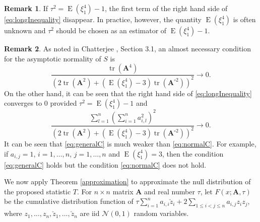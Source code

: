 \documentclass[bj]{imsart}
\DeclareMathOperator{\mytr}{tr}
\DeclareMathOperator{\myE}{E}
\newcommand{\BA}{\mathbf{A}}    \newcommand{\BB}{\mathbf{B}}    \newcommand{\BC}{\mathbf{C}}    \newcommand{\BD}{\mathbf{D}}    \newcommand{\BE}{\mathbf{E}}    \newcommand{\BF}{\mathbf{F}}    \newcommand{\BG}{\mathbf{G}}    \newcommand{\BH}{\mathbf{H}}    \newcommand{\BI}{\mathbf{I}}    \newcommand{\BJ}{\mathbf{J}}    \newcommand{\BK}{\mathbf{K}}    \newcommand{\BL}{\mathbf{L}}
\theoremstyle{plain}
\theoremstyle{definition}
\newtheorem{remark}{\quad\quad Remark}
\theoremstyle{remark}
\begin{document}
\begin{remark}\label{remark1}
    If $\tau^2=\myE (\xi_1^4) -1$, the first term of the right hand side of \eqref{eq:longInequality} disappear.
    In practice, however, the quantity $\myE (\xi_1^4)$ is often unknown and
    $\tau^2$ should be chosen as an estimator of $\myE (\xi_1^4)-1$.
\end{remark}

\begin{remark}
    As noted in Chatterjee \cite{Chatterjee2008}, Section 3.1, an almost necessary condition for the asymptotic normality of $S$ is
    \begin{equation}\label{eq:normalC}
        \frac{\mytr (\BA^4)}{
            \left( 
        2 \mytr(\BA^2)
    +
    (\myE (\xi_1^4)-3)\mytr(\BA^{\circ 2})
            \right)^2
        }\to 0. 
    \end{equation}
    On the other hand, it can be seen that the right hand side of \eqref{eq:longInequality} converges to $0$ provided $\tau^2=\myE (\xi_1^4)-1$ and
    \begin{equation}\label{eq:generalC}
            \frac{
                \sum_{l=1}^n \left( \sum_{i=1}^n a_{i,l}^2 \right)^2
            }{
            \left(
        2 \mytr(\BA^2)
    +
    (\myE (\xi_1^4)-3)\mytr(\BA^{\circ 2})
\right)^{2}
            }
            \to 0.
    \end{equation}
    It can be seen that \eqref{eq:generalC} is much weaker than \eqref{eq:normalC}.
    For example, if $a_{i,j}=1$, $i=1,\ldots, n$, $j=1,\ldots, n$ and $\myE (\xi_1^4)=3$, then the condition \eqref{eq:generalC} holds but the condition \eqref{eq:normalC} does not hold.
\end{remark}


We now apply Theorem \ref{approximation} to approximate the null distribution of the proposed statistic $T$.
For $n\times n$ matrix $\BA$ and real number $\tau$, let $F (x;{\BA,\tau})$ be the cumulative distribution function of $
        \tau \sum_{i=1}^n  a_{i,i}\check z_i
    +2\sum_{1\leq i <j \leq n} a_{i,j} z_i z_j
    $,
    where $z_1,\ldots, z_n, \check z_1, \ldots, \check z_n$ are iid  $\mathcal N(0,1)$ random variables.
\end{document}
